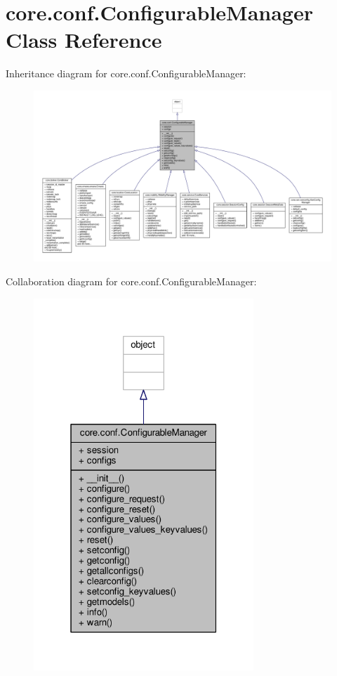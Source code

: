 \hypertarget{classcore_1_1conf_1_1_configurable_manager}{\section{core.\+conf.\+Configurable\+Manager Class Reference}
\label{classcore_1_1conf_1_1_configurable_manager}
}


Inheritance diagram for core.\+conf.\+Configurable\+Manager\+:
\nopagebreak
\begin{figure}[H]
\begin{center}
\leavevmode
\includegraphics[width=350pt]{classcore_1_1conf_1_1_configurable_manager__inherit__graph}
\end{center}
\end{figure}


Collaboration diagram for core.\+conf.\+Configurable\+Manager\+:
\nopagebreak
\begin{figure}[H]
\begin{center}
\leavevmode
\includegraphics[width=235pt]{classcore_1_1conf_1_1_configurable_manager__coll__graph}
\end{center}
\end{figure}
